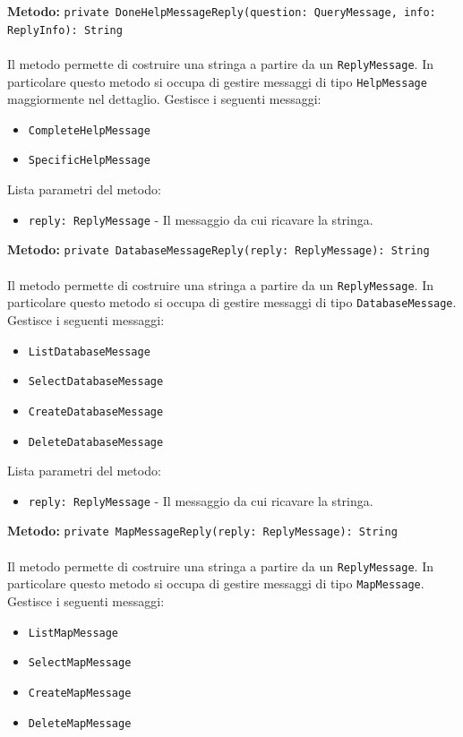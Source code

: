 \documentclass[a4paper]{article}
\begin{document}
		\textbf{Metodo: }\texttt{private DoneHelpMessageReply(question: QueryMessage, info: ReplyInfo): String}
			\\ \\
			Il metodo permette di costruire una stringa a partire da un \texttt{ReplyMessage}. In particolare questo metodo si occupa di gestire messaggi di tipo \texttt{HelpMessage} maggiormente nel dettaglio.
			Gestisce i seguenti messaggi:
			\begin{itemize}
				\item \texttt{CompleteHelpMessage}
				\item \texttt{SpecificHelpMessage}
			\end{itemize}
			Lista parametri del metodo:
			\begin{itemize}
				\item \texttt{reply: ReplyMessage} - Il messaggio da cui ricavare la stringa.
			\end{itemize}
		\textbf{Metodo: }\texttt{private DatabaseMessageReply(reply: ReplyMessage): String}
			\\ \\
			Il metodo permette di costruire una stringa a partire da un \texttt{ReplyMessage}. In particolare questo metodo si occupa di gestire messaggi di tipo \texttt{DatabaseMessage}.
			Gestisce i seguenti messaggi:
			\begin{itemize}
				\item \texttt{ListDatabaseMessage}
				\item \texttt{SelectDatabaseMessage}
				\item \texttt{CreateDatabaseMessage}
				\item \texttt{DeleteDatabaseMessage}
			\end{itemize}
			Lista parametri del metodo:
			\begin{itemize}
				\item \texttt{reply: ReplyMessage} - Il messaggio da cui ricavare la stringa.
			\end{itemize}
		\textbf{Metodo: }\texttt{private MapMessageReply(reply: ReplyMessage): String}
			\\ \\
			Il metodo permette di costruire una stringa a partire da un \texttt{ReplyMessage}. In particolare questo metodo si occupa di gestire messaggi di tipo \texttt{MapMessage}.
			Gestisce i seguenti messaggi:
			\begin{itemize}
				\item \texttt{ListMapMessage}
				\item \texttt{SelectMapMessage}
				\item \texttt{CreateMapMessage}
				\item \texttt{DeleteMapMessage}
			\end{itemize}
\end{document}
